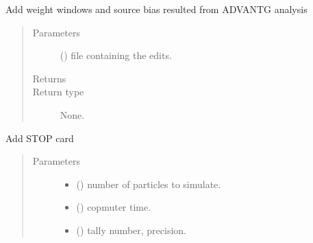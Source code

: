 \documentclass[letterpaper,10pt,english]{sphinxmanual}
\begin{document}
\begin{fulllineitems}
\begin{fulllineitems}
\label{\detokenize{api/inputgeneration:inputfile.InputFile.add_edits}}
Add weight windows and source bias resulted from ADVANTG analysis
\begin{quote}\begin{description}
\item[{Parameters}] \leavevmode
{} () \textendash{} file containing the edits.

\item[{Returns}] \leavevmode


\item[{Return type}] \leavevmode
None.

\end{description}\end{quote}

\end{fulllineitems}


\begin{fulllineitems}
\label{\detokenize{api/inputgeneration:inputfile.InputFile.add_stopCard}}
Add STOP card
\begin{quote}\begin{description}
\item[{Parameters}] \leavevmode\begin{itemize}
\item {} 
 () \textendash{} number of particles to simulate.

\item {} 
 () \textendash{} copmuter time.

\item {} 
 (\sphinxstyleliteralemphasis{\sphinxupquote{(}}\sphinxstyleliteralemphasis{\sphinxupquote{, }}\sphinxstyleliteralemphasis{\sphinxupquote{)}}) \textendash{} tally number, precision.


\end{itemize}
\end{description}
\end{quote}
\end{fulllineitems}
\end{fulllineitems}
\end{document}
